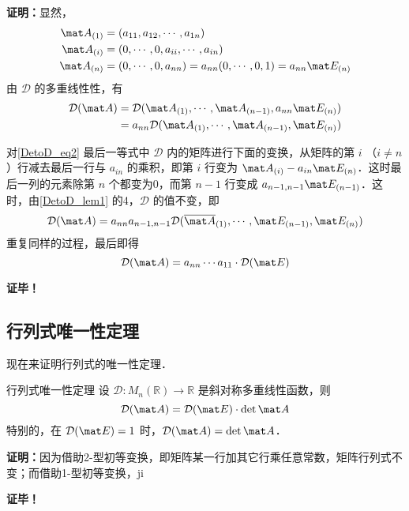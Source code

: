\textbf{证明：}显然，
\begin{equation}
\begin{aligned}
\mat A_{(1)}&=(a_{11},a_{12},\cdots,a_{1n})\\
\mat A_{(i)}&=(0,\cdots,0,a_{ii},\cdots,a_{in})\\
\mat A_{(n)}&=(0,\cdots,0,a_{nn})=a_{nn}(0,\cdots,0,1)=a_{nn}\mat E_{(n)}
\end{aligned}
\end{equation}
由 $\mathcal D$ 的多重线性性，有
\begin{equation}\label{DetoD_eq2}
\begin{aligned}
\mathcal D(\mat A)&=\mathcal D(\mat A_{(1)},\cdots,\mat A_{(n-1)},a_{nn}\mat E_{(n)})\\
&=a_{nn}\mathcal D(\mat A_{(1)},\cdots,\mat A_{(n-1)},\mat E_{(n)})
\end{aligned}
\end{equation}

对\autoref{DetoD_eq2} 最后一等式中 $\mathcal D$ 内的矩阵进行下面的变换，从矩阵的第 $i$ （$i\neq n$）行减去最后一行与 $a_{in}$ 的乘积，即第 $i$ 行变为 $\mat A_{(i)}-a_{in}\mat E_{(n)}$．这时最后一列的元素除第 $n$ 个都变为0，而第 $n-1$ 行变成 $a_{n-1,n-1}\mat E_{(n-1)}$．这时，由\autoref{DetoD_lem1} 的4，$\mathcal D$ 的值不变，即
\begin{equation}
\mathcal D(\mat A)=a_{nn}a_{n-1,n-1}\mathcal D(\overline{\mat A}_{(1)},\cdots,\mat E_{(n-1)},\mat E_{(n)})
\end{equation}
重复同样的过程，最后即得
\begin{equation}
\mathcal D(\mat A)=a_{nn}\cdots a_{11}\cdot \mathcal D(\mat E)
\end{equation}

\textbf{证毕！}
\subsection{行列式唯一性定理}
现在来证明行列式的唯一性定理．
\begin{theorem}{行列式唯一性定理}
设 $\mathcal D:M_n(\mathbb R)\rightarrow \mathbb R$ 是斜对称多重线性函数，则
\begin{equation}
\mathcal D(\mat A)=\mathcal D(\mat E)\cdot \det \mat A
\end{equation}
特别的，在 $\mathcal D(\mat E)=1$ 时，$\mathcal D(\mat A)=\det \mat A$．
\end{theorem}
\textbf{证明：}因为借助2-型初等变换，即矩阵某一行加其它行乘任意常数，矩阵行列式不变；而借助1-型初等变换，ji

\textbf{证毕！}